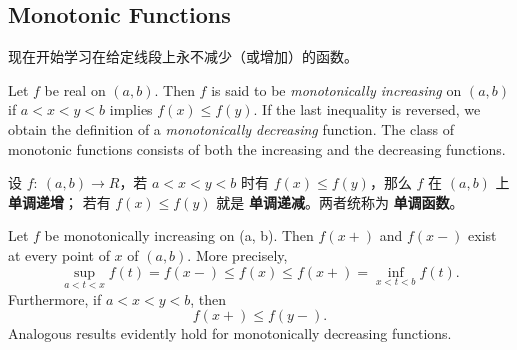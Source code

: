 \documentclass[../poma-notes.tex]{subfiles}
\begin{document}
\subsection*{Monotonic Functions}

现在开始学习在给定线段上永不减少（或增加）的函数。

\begin{definition}
  Let $f$ be real on $(a, b)$. Then $f$ is said to be \textit{monotonically increasing} on $(a, b)$ if
  $a < x < y < b$ implies $f(x) \le f(y)$. If the last inequality is reversed, we obtain the definition of
  a \textit{monotonically decreasing} function. The class of monotonic functions consists of both the
  increasing and the decreasing functions.
\end{definition}

\begin{anote}
  设 $f:\ (a, b) \to R$，若 $a < x < y < b$ 时有 $f(x) \le f(y)$，那么 $f$ 在 $(a, b)$ 上 \textbf{单调递增}；
  若有 $f(x) \le f(y)$ 就是 \textbf{单调递减}。两者统称为 \textbf{单调函数}。
\end{anote}

\begin{theorem}
  Let $f$ be monotonically increasing on (a, b). Then $f(x+)$ and $f(x-)$ exist at every point of $x$ of $(a, b)$.
  More precisely,
  \begin{equation}
    \sup_{a<t<x} f(t) = f(x-) \le f(x) \le f(x+) = \inf_{x<t<b} f(t).
  \end{equation}
  Furthermore, if $a < x < y < b$, then
  \begin{equation}
    f(x+) \le f(y-).
  \end{equation}
  Analogous results evidently hold for monotonically decreasing functions.
\end{theorem}
\end{document}

